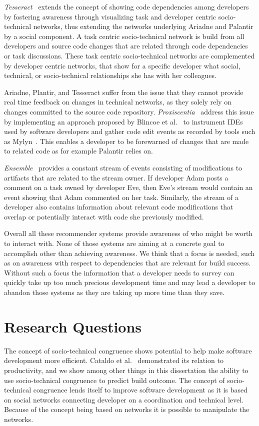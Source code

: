 \emph{Tesseract}~\cite{sarma:icse:2009} extends the concept of showing code dependencies among developers by fostering awareness through visualizing task and developer centric socio-technical networks, thus extending the networks underlying Ariadne and Palantir by a social component.
A task centric socio-technical network is build from all developers and source code changes that are related through code dependencies or task discussions.
These task centric socio-technical networks are complemented by developer centric networks, that show for a specific developer what social, technical, or socio-technical relationships she has with her colleagues.

Ariadne, Plantir, and Tesseract suffer from the issue that they cannot provide real time feedback on changes in  technical networks, as they solely rely on changes committed to the source code repository. 
\emph{Proxiscentia}~\cite{borici:chase:2012} address this issue by implementing an approach proposed by Blincoe et al.~\cite{blincoe:cscw:2012} to instrument IDEs used by software developers and gather code edit events as recorded by tools such as Mylyn~\cite{kersten:aosd:2005}.
This enables a developer to be forewarned of changes that are made to related code as for example Palantir relies on.

\emph{Ensemble}~\cite{xiang:rsse:2008} provides a constant stream of events consisting of modifications to artifacts that are related to the stream owner.
If developer Adam posts a comment on a task owned by developer Eve, then Eve's stream would contain an event showing that Adam commented on her task.
Similarly, the stream of a developer also contains information about relevant code modifications that overlap or potentially interact with code she previously modified.

Overall all these recommender systems provide awareness of who might be worth to interact with.
None of those systems are aiming at a concrete goal to accomplish other than achieving awareness.
We think that a focus is needed, such as on awareness with respect to dependencies that are relevant for build success.
Without such a focus the information that a developer needs to survey can quickly take up too much precious development time and may lead a developer to abandon those systems as they are taking up more time than they save.


\section{Research Questions}
The concept of socio-technical congruence shows potential to help make software development more efficient.
Cataldo et al.~\cite{cataldo:cscw:2006} demonstrated its relation to productivity, and we show among other things in this dissertation the ability to use socio-technical congruence to predict build outcome.
The concept of socio-technical congruence lends itself to improve software development as it is based on social networks connecting developer on a coordination and technical level.
Because of the concept being based on networks it is possible to manipulate the networks.

